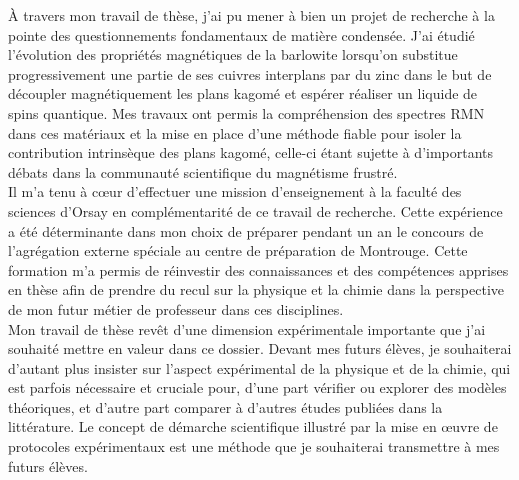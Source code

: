 \vspace{2mm}
\`{A} travers mon travail de thèse, j'ai pu mener à bien un projet de recherche à la pointe des questionnements fondamentaux de matière condensée. J'ai étudié l'évolution des propriétés magnétiques de la barlowite lorsqu'on substitue progressivement une partie de ses cuivres interplans par du zinc dans le but de découpler magnétiquement les plans kagomé et espérer réaliser un liquide de spins quantique. Mes travaux ont permis la compréhension des spectres RMN dans ces matériaux et la mise en place d'une méthode fiable pour isoler la contribution intrinsèque des plans kagomé, celle-ci étant sujette à d'importants débats dans la communauté scientifique du magnétisme frustré. \\

Il m'a tenu à c\oe ur d'effectuer une mission d'enseignement à la faculté des sciences d'Orsay en complémentarité de ce travail de recherche. Cette expérience a été déterminante dans mon choix de préparer pendant un an le concours de l'agrégation externe spéciale au centre de préparation de Montrouge. Cette formation m'a permis de réinvestir des connaissances et des compétences apprises en thèse afin de prendre du recul sur la physique et la chimie dans la perspective de mon futur métier de professeur dans ces disciplines.\\

Mon travail de thèse revêt d'une dimension expérimentale importante que j'ai souhaité mettre en valeur dans ce dossier. Devant mes futurs élèves, je souhaiterai d'autant plus insister sur l'aspect expérimental de la physique et de la chimie, qui est parfois nécessaire et cruciale pour, d'une part vérifier ou explorer des modèles théoriques, et d'autre part comparer à d'autres études publiées dans la littérature. Le concept de démarche scientifique illustré par la mise en \oe uvre de protocoles expérimentaux est une méthode que je souhaiterai transmettre à mes futurs élèves.
%
